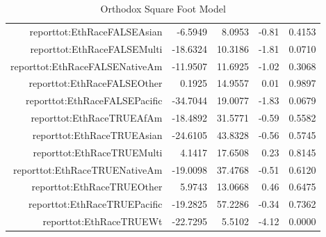 \documentclass{article}
\begin{document}
\begin{table}[ht]
\begin{tabular}{rrrrr}
$$  reporttot:EthRaceFALSEAsian & -6.5949 & 8.0953 & -0.81 & 0.4153 \\ 
  reporttot:EthRaceFALSEMulti & -18.6324 & 10.3186 & -1.81 & 0.0710 \\ 
  reporttot:EthRaceFALSENativeAm & -11.9507 & 11.6925 & -1.02 & 0.3068 \\ 
  reporttot:EthRaceFALSEOther & 0.1925 & 14.9557 & 0.01 & 0.9897 \\ 
  reporttot:EthRaceFALSEPacific & -34.7044 & 19.0077 & -1.83 & 0.0679 \\ 
  reporttot:EthRaceTRUEAfAm & -18.4892 & 31.5771 & -0.59 & 0.5582 \\ 
  reporttot:EthRaceTRUEAsian & -24.6105 & 43.8328 & -0.56 & 0.5745 \\ 
  reporttot:EthRaceTRUEMulti & 4.1417 & 17.6508 & 0.23 & 0.8145 \\ 
  reporttot:EthRaceTRUENativeAm & -19.0098 & 37.4768 & -0.51 & 0.6120 \\ 
  reporttot:EthRaceTRUEOther & 5.9743 & 13.0668 & 0.46 & 0.6475 \\ 
  reporttot:EthRaceTRUEPacific & -19.2825 & 57.2286 & -0.34 & 0.7362 \\ 
  reporttot:EthRaceTRUEWt & -22.7295 & 5.5102 & -4.12 & 0.0000 \\ 
   \hline
\end{tabular}
\caption{Orthodox Square Foot Model} 
\label{tab:OrthoSQFT}
\end{table}
\end{document}
